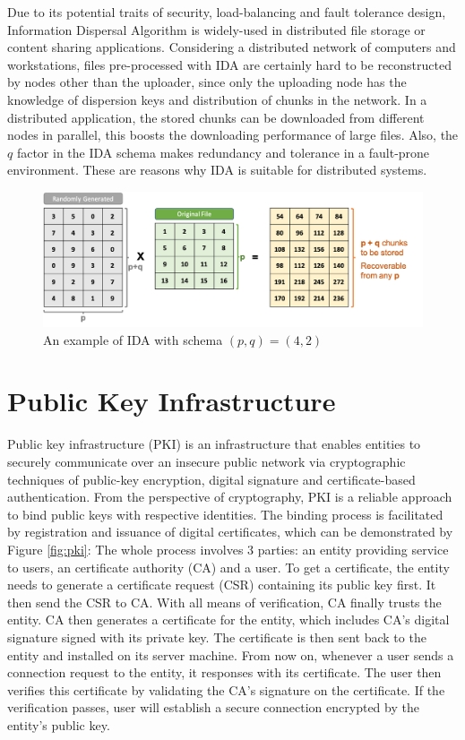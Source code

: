 Due to its potential traits of security, load-balancing and fault tolerance design, Information Dispersal Algorithm is widely-used in distributed file storage or content sharing applications. Considering a distributed network of computers and workstations, files pre-processed with IDA are certainly hard to be reconstructed by nodes other than the uploader, since only the uploading node has the knowledge of dispersion keys and distribution of chunks in the network. In a distributed application, the stored chunks can be downloaded from different nodes in parallel, this boosts the downloading performance of large files.  Also, the $q$ factor in the IDA schema makes redundancy and tolerance in a fault-prone environment. These are reasons why IDA is suitable for distributed systems.

\begin{figure}[hbt]
\centering
  \includegraphics[width=13cm]{figures/ida.png}
  \caption{An example of IDA with schema $(p,q)=(4,2)$}
  \label{fig:ida}
\end{figure}

\newpage

\section{Public Key Infrastructure}
\label{s:publickeyinfrastructure}

Public key infrastructure (PKI) is an infrastructure that enables entities to securely communicate over an insecure public network via cryptographic techniques of public-key encryption, digital signature and certificate-based authentication. From the perspective of cryptography, PKI is a reliable approach to bind public keys with respective identities. The binding process is facilitated by registration and issuance of digital certificates, which can be demonstrated by Figure \ref{fig:pki}: The whole process involves 3 parties: an entity providing service to users, an certificate authority (CA) and a user. To get a certificate, the entity needs to generate a certificate request (CSR) containing its public key first. It then send the CSR to CA. With all means of verification, CA finally trusts the entity. CA then generates a certificate for the entity, which includes CA's digital signature signed with its private key. The certificate is then sent back to the entity and installed on its server machine. From now on, whenever a user sends a connection request to the entity, it responses with its certificate. The user then verifies this certificate by validating the CA's signature on the certificate. If the verification passes, user will establish a secure connection encrypted by the entity's public key.

